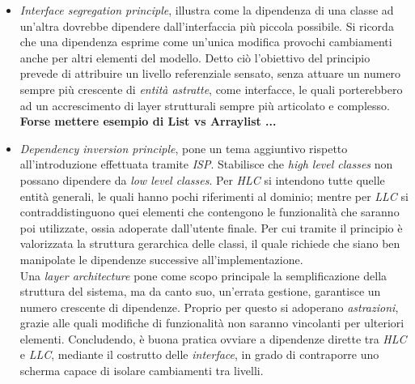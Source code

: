 \documentclass{article}
\begin{document}
\begin{itemize}[label={-}]
    \item \textit{Interface segregation principle}, illustra come la dipendenza di una classe ad un'altra dovrebbe dipendere dall'interfaccia più piccola possibile. Si ricorda che una dipendenza esprime come un'unica modifica provochi cambiamenti anche per altri elementi del modello. Detto ciò l'obiettivo del principio prevede di attribuire un livello referenziale sensato, senza attuare un numero sempre più crescente di \textit{entità astratte}, come interfacce, le quali porterebbero ad un accrescimento di layer strutturali sempre più articolato e complesso. \textbf{Forse mettere esempio di List vs Arraylist ...}
    \item \textit{Dependency inversion principle}, pone un tema aggiuntivo rispetto all'introduzione effettuata tramite \textit{ISP}. Stabilisce che \textit{high level classes} non possano dipendere da \textit{low level classes}. Per \textit{HLC} si intendono tutte quelle entità generali, le quali hanno pochi riferimenti al dominio; mentre per \textit{LLC} si contraddistinguono quei elementi che contengono le funzionalità che saranno poi utilizzate, ossia adoperate dall'utente finale. Per cui tramite il principio è valorizzata la struttura gerarchica delle classi, il quale richiede che siano ben manipolate le dipendenze successive all'implementazione.\vspace*{14pt}\\ Una \textit{layer architecture} pone come scopo principale la semplificazione della struttura del sistema, ma da canto suo, un'errata gestione, garantisce un numero crescente di dipendenze. Proprio per questo si adoperano \textit{astrazioni}, grazie alle quali modifiche di funzionalità non saranno vincolanti per ulteriori elementi. Concludendo, è buona pratica ovviare a dipendenze dirette tra \textit{HLC} e \textit{LLC}, mediante il costrutto delle \textit{interface}, in grado di contraporre uno scherma capace di isolare cambiamenti tra livelli. 
\end{itemize}
\end{document}
